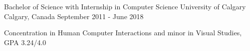 \begin{cventries}
  \cventry
    {Bachelor of Science with Internship in Computer Science}
    {University of Calgary}
    {Calgary, Canada}
    {September 2011 - June 2018}
    {
      \begin{cvitems}
      \item {Concentration in Human Computer Interactions and minor in Visual Studies, GPA 3.24/4.0}
      \end{cvitems}
    }
\end{cventries}
